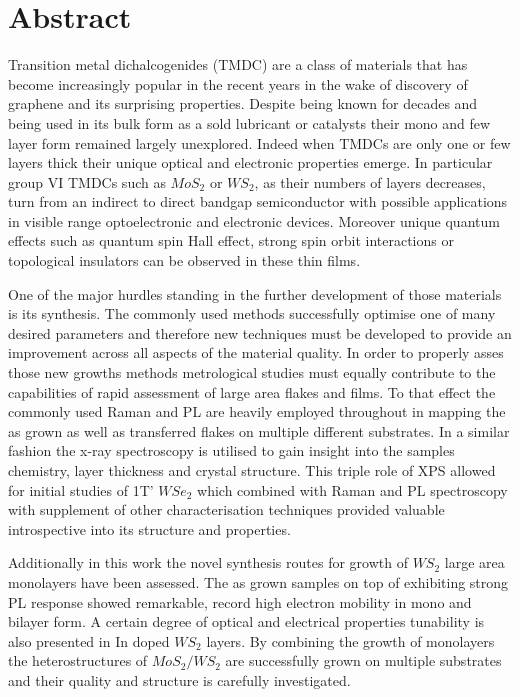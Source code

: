 \section*{Abstract}

Transition metal dichalcogenides (TMDC) are a class of materials that has become increasingly popular in the recent years in the wake of discovery of graphene and its surprising properties. Despite being known for decades and being used in its bulk form as a sold lubricant or catalysts their mono and few layer form remained largely unexplored. Indeed when TMDCs are only one or few layers thick their unique optical and electronic properties emerge. In particular group VI TMDCs such as $MoS_2$ or $WS_2$, as their numbers of layers decreases, turn from an indirect to direct bandgap semiconductor with possible applications in visible range optoelectronic and electronic devices. Moreover unique quantum effects such as quantum spin Hall effect, strong spin orbit interactions or topological insulators can be observed in these thin films.

One of the major hurdles standing in the further development of those materials is its synthesis. The commonly used methods successfully optimise one of many desired parameters and therefore new techniques must be developed to provide an improvement across all aspects of the material quality. In order to properly asses those new growths methods metrological studies must equally contribute to the capabilities of rapid assessment of large area flakes and films. To that effect the commonly used Raman and PL are heavily employed throughout in mapping the as grown as well as transferred flakes on multiple different substrates. In a similar fashion the x-ray spectroscopy is utilised to gain insight into the samples chemistry, layer thickness and crystal structure. This triple role of XPS allowed for initial studies of 1T' $WSe_2$ which combined with Raman and PL spectroscopy with supplement of other characterisation techniques provided valuable introspective into its structure and properties.

Additionally in this work the novel synthesis routes for growth of $WS_2$ large area monolayers have been assessed. The as grown samples on top of exhibiting strong PL response showed remarkable, record high electron mobility in mono and bilayer form. A certain degree of optical and electrical properties tunability is also presented in In doped $WS_2$ layers. By combining the growth of monolayers the heterostructures of $MoS_2/WS_2$ are successfully grown on multiple substrates and their quality and structure is carefully investigated.